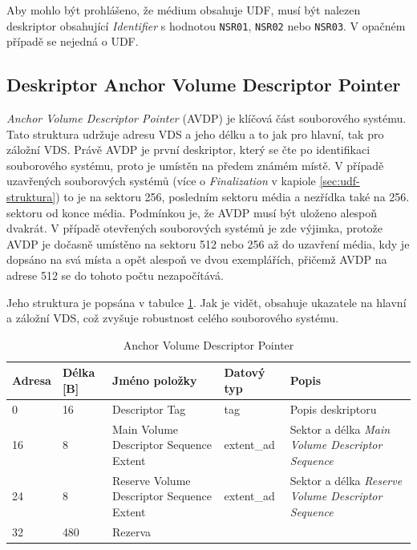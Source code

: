 Aby mohlo být prohlášeno, že médium obsahuje UDF, musí být nalezen deskriptor obsahující \textit{Identifier} s hodnotou \texttt{NSR01}, \texttt{NSR02} nebo \texttt{NSR03}. V opačném případě se nejedná o UDF.

\subsection{Deskriptor Anchor Volume Descriptor Pointer}
\label{subsec:avdp}
\textit{Anchor Volume Descriptor Pointer} (AVDP) je klíčová část souborového systému. Tato struktura udržuje adresu VDS a jeho délku a to jak pro hlavní, tak pro záložní VDS. Právě AVDP je první deskriptor, který se čte po identifikaci souborového systému, proto je umístěn na předem známém místě. V případě uzavřených souborových systémů (více o \textit{Finalization} v kapiole \ref{sec:udf-struktura}) to je na sektoru 256, posledním sektoru média a nezřídka také na 256. sektoru od konce média. Podmínkou je, že AVDP musí být uloženo alespoň dvakrát. V případě otevřených souborových systémů je zde výjimka, protože AVDP je dočasně umístěno na sektoru 512 nebo 256 až do uzavření média, kdy je dopsáno na svá místa a opět alespoň ve dvou exemplářích, přičemž AVDP na adrese 512 se do tohoto počtu nezapočítává.

Jeho struktura je popsána v tabulce \ref{tab:avdp}. Jak je vidět, obsahuje ukazatele na hlavní a záložní VDS, což zvyšuje robustnost celého souborového systému.
\begin{table}[]
    \centering
    \begin{tabular}{ | l | l | p{4.2cm} | p{1.8cm} | p{5.5cm} | }
        \hline
        Adresa  & Délka [B]   & Jméno položky & Datový typ    & Popis \\ \hline\hline
        0       & 16          & Descriptor Tag & tag        & Popis deskriptoru \\ \hline
        16      & 8           & Main Volume Descriptor Sequence Extent & extent\_ad & Sektor a délka \textit{Main Volume Descriptor Sequence} \\ \hline
        24      & 8           & Reserve Volume Descriptor Sequence Extent & extent\_ad & Sektor a délka \textit{Reserve Volume Descriptor Sequence} \\ \hline
        32      & 480         & Rezerva & & \\ \hline
    \end{tabular}
    \caption{Anchor Volume Descriptor Pointer\label{tab:avdp}}
\end{table}

